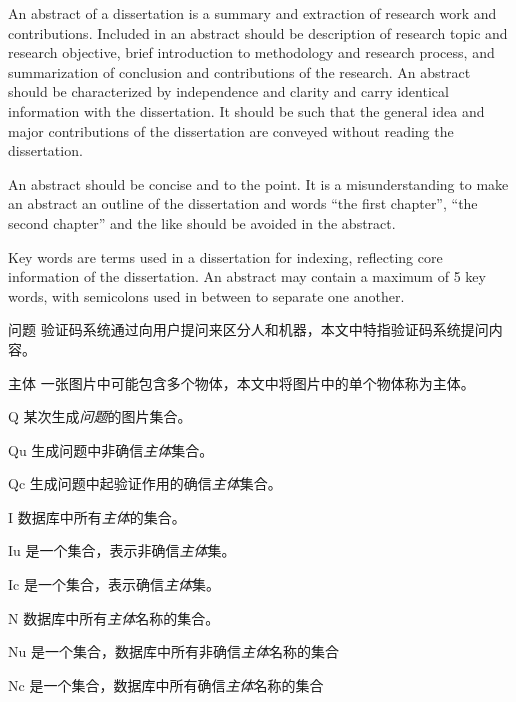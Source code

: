 \documentclass[bachelor,zhspacing]{cqu}  %
\begin{document}
\begin{enabstract}
     An abstract of a dissertation is a summary and extraction of 
research work and contributions. Included in an abstract should be 
description of research topic and research objective, brief 
introduction to methodology and research process, and summarization 
of conclusion and contributions of the research. An abstract should be 
characterized by independence and clarity and carry identical 
information with the dissertation. It should be such that the general 
idea and major contributions of the dissertation are conveyed
without reading the dissertation.\par
     An abstract should be concise and to the point. It is a 
misunderstanding to make an abstract an outline of the dissertation and 
words “the first chapter”, “the second chapter” and the like should be 
avoided in the abstract.\par
     Key words are terms used in a dissertation for indexing, 
reflecting core information of the dissertation. An abstract may 
contain a maximum of 5 key words, with semicolons used in between to 
separate one another.
\end{enabstract}

\tableofcontents
\listoffigures
\listoftables


\begin{denotation}{2.5}{0}


\item[问题] 验证码系统通过向用户提问来区分人和机器，本文中特指验证码系统提问内容。
\item[主体] 一张图片中可能包含多个物体，本文中将图片中的单个物体称为主体。

\item[Q] 某次生成\emph{问题}的图片集合。

\item[Qu] 生成问题中非确信\emph{主体}集合。
\item[Qc] 生成问题中起验证作用的确信\emph{主体}集合。

\item[I] 数据库中所有\emph{主体}的集合。
\item[Iu] 是一个集合，表示非确信\emph{主体}集。
\item[Ic] 是一个集合，表示确信\emph{主体}集。

\item[N] 数据库中所有\emph{主体}名称的集合。
\item[Nu] 是一个集合，数据库中所有非确信\emph{主体}名称的集合
\item[Nc] 是一个集合，数据库中所有确信\emph{主体}名称的集合


\end{denotation}
\end{document}
